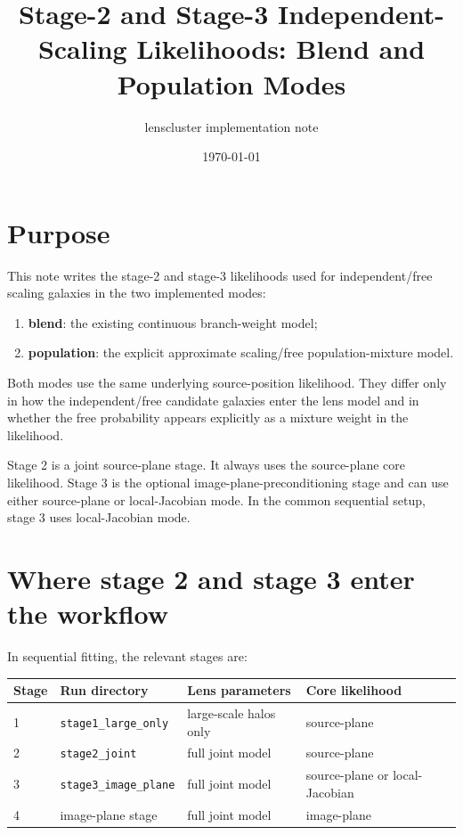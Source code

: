 \documentclass[11pt]{article}
\title{Stage-2 and Stage-3 Independent-Scaling Likelihoods: Blend and Population Modes}
\author{lenscluster implementation note}
\date{\today}
\begin{document}
\maketitle

\section{Purpose}

This note writes the stage-2 and stage-3 likelihoods used for independent/free
scaling galaxies in the two implemented modes:
\renewcommand{\labelenumi}{(\roman{enumi})}
\begin{enumerate}
    \item \textbf{blend}: the existing continuous branch-weight model;
    \item \textbf{population}: the explicit approximate scaling/free
    population-mixture model.
\end{enumerate}
Both modes use the same underlying source-position likelihood.
They differ only in how the independent/free candidate galaxies enter the
lens model and in whether the free probability appears explicitly as a
mixture weight in the likelihood.

Stage 2 is a joint source-plane stage. It always uses the source-plane core
likelihood. Stage 3 is the optional image-plane-preconditioning stage and can
use either source-plane or local-Jacobian mode. In the common sequential setup,
stage 3 uses local-Jacobian mode.

\section{Where stage 2 and stage 3 enter the workflow}

In sequential fitting, the relevant stages are:
\begin{center}
\begin{tabular}{llll}
\toprule
Stage & Run directory & Lens parameters & Core likelihood\\
\midrule
1 & \texttt{stage1\_large\_only} & large-scale halos only & source-plane\\
2 & \texttt{stage2\_joint} & full joint model & source-plane\\
3 & \texttt{stage3\_image\_plane} & full joint model & source-plane or local-Jacobian\\
4 & image-plane stage & full joint model & image-plane\\
\bottomrule
\end{tabular}
\end{center}
\end{document}
